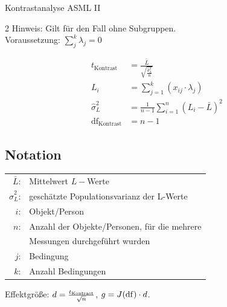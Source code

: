 \begin{formulaBox}{Kontrastanalyse AS}{ML II}
\begin{multicols}{2}
Hinweis: Gilt für den Fall ohne Subgruppen.\\
Voraussetzung: $\sum\limits_{j}^{k}\lambda_j = 0$

\begin{align*}
t_{\mathrm{Kontrast}} &= \frac{\bar{L}}{\sqrt{\frac{\hat{\sigma}^2_{L}}{n}}} \\
L_i &= \sum_{j=1}^k (x_{ij} \cdot \lambda_{j}) \\
\hat{\sigma}^2_{L} &= \frac{1}{n-1} \sum_{i=1}^n (L_i - \bar{L})^2 \\
\mathrm{df}_{\mathrm{Kontrast}} &= n-1
\end{align*}

\subsection*{Notation}
\begin{tabular}{rl}
$\bar{L}$: &Mittelwert $L-$Werte\\
$\hat{\sigma}^2_L$: &geschätzte Populationsvarianz der L-Werte\\
$i$: & Objekt/Person\\
$n$: & Anzahl der Objekte/Personen, für die mehrere \\
     & Messungen durchgeführt wurden\\
$j$: & Bedingung\\
$k$: & Anzahl Bedingungen\\
\end{tabular}
\par Effektgröße: $d=\frac{t_{\mathrm{Kontrast}}}{\sqrt{n}}$, $g=J(\mathrm{df})\cdot d$.
\end{multicols}
\end{formulaBox}
